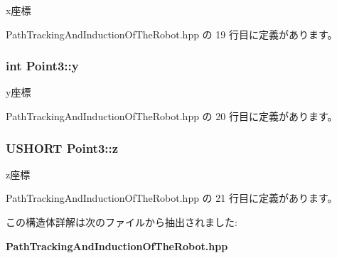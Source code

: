 x座標 



 Path\-Tracking\-And\-Induction\-Of\-The\-Robot.\-hpp の 19 行目に定義があります。

\subsubsection[{y}]{\setlength{\rightskip}{0pt plus 5cm}int Point3\-::y}\label{struct_point3_ab6971f71fa10eb79349cd2fdb88ec3f2}


y座標 



 Path\-Tracking\-And\-Induction\-Of\-The\-Robot.\-hpp の 20 行目に定義があります。

\subsubsection[{z}]{\setlength{\rightskip}{0pt plus 5cm}U\-S\-H\-O\-R\-T Point3\-::z}\label{struct_point3_a205a0d0ecf33c38941118591a5b5a1e2}


z座標 



 Path\-Tracking\-And\-Induction\-Of\-The\-Robot.\-hpp の 21 行目に定義があります。



この構造体詳解は次のファイルから抽出されました\-:\begin{DoxyCompactItemize}
\item 
{\bf Path\-Tracking\-And\-Induction\-Of\-The\-Robot.\-hpp}\end{DoxyCompactItemize}
